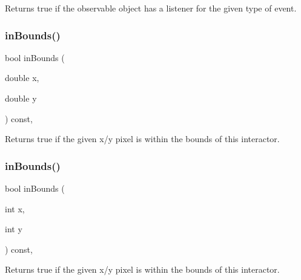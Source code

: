 Returns true if the observable object has a listener for the given type of event. 

\mbox{\label{classGInteractor_afc480f652b8c5f1fb255e2269ce68879}} 
\subsubsection{\texorpdfstring{in\+Bounds()}{inBounds()}\hspace{0.1cm}{\footnotesize\ttfamily [1/2]}}
{\footnotesize\ttfamily bool in\+Bounds (\begin{DoxyParamCaption}\item[{double}]{x,  }\item[{double}]{y }\end{DoxyParamCaption}) const\hspace{0.3cm}{\ttfamily [virtual]}, {\ttfamily [inherited]}}



Returns true if the given x/y pixel is within the bounds of this interactor. 

\mbox{\label{classGInteractor_ae6d7982c1c627b677a5e776ca86118ed}} 
\subsubsection{\texorpdfstring{in\+Bounds()}{inBounds()}\hspace{0.1cm}{\footnotesize\ttfamily [2/2]}}
{\footnotesize\ttfamily bool in\+Bounds (\begin{DoxyParamCaption}\item[{int}]{x,  }\item[{int}]{y }\end{DoxyParamCaption}) const\hspace{0.3cm}{\ttfamily [virtual]}, {\ttfamily [inherited]}}



Returns true if the given x/y pixel is within the bounds of this interactor. 

\mbox{\label{classGObservable_aeec1adc19aa0f33de62390686ee1382c}} 
